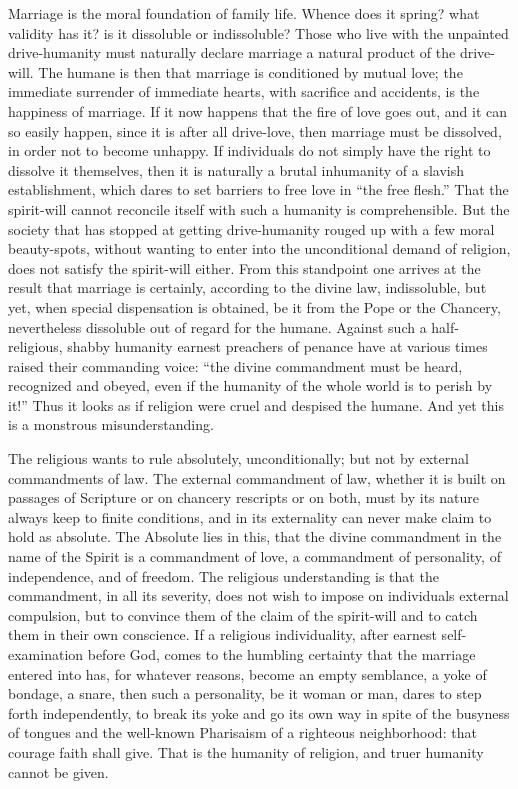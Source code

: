 \documentclass[12pt,a4paper,openany]{book}
\newcommand{\opage}[1]{\marginnote{\footnotesize\textit{[#1]}}}
\begin{document}
Marriage is the moral foundation of family life.
Whence does it spring? what validity has it? is it
dissoluble or indissoluble? Those who live with the unpainted
drive-humanity must naturally declare marriage
a natural product of the drive-will. The humane is
then that marriage is conditioned by mutual love;
the immediate surrender of immediate hearts, with sacrifice
and accidents, is the happiness of marriage. If it now happens
that the fire of love goes out, and it can so easily happen,
since it is after all drive-love, then marriage must be dissolved,
in order not to become unhappy. If individuals do not
simply have the right to dissolve it themselves, then it is naturally a brutal
inhumanity of a slavish establishment, which dares to
set barriers to free love in ``the free
flesh.'' That the spirit-will cannot reconcile itself with such a
humanity is comprehensible. But the society that has
stopped at getting drive-humanity rouged up with
a few moral beauty-spots, without wanting to enter
into the unconditional demand of religion, does not satisfy
the spirit-will either. From this standpoint one arrives at the result
that marriage is certainly, according to the divine law,
indissoluble, but yet, when special dispensation is obtained,
be it from the Pope or the Chancery, nevertheless dissoluble
out of regard for the humane. Against such a half-religious,
shabby humanity earnest preachers of penance
have at various times raised their commanding voice: ``the
divine commandment must be heard, recognized and obeyed, even if
the humanity of the whole world is to perish by it!'' Thus
it looks as if religion were cruel and despised
the humane. And yet this is a monstrous misunderstanding.

The religious wants to rule absolutely, unconditionally; but not
by external commandments of law. The external commandment of law, whether
it is built on passages of Scripture or on chancery rescripts or
\setcounter{footnote}{0}%
\opage{77}on both, must by its nature always keep to
finite conditions, and in its externality can
never make claim to hold as absolute. The
Absolute lies in this, that the divine commandment in the name of the Spirit
is a commandment of love, a commandment of personality, of independence,
and of freedom. The religious understanding
is that the commandment, in all its severity, does not wish to impose on individuals
external compulsion, but to convince them of the
claim of the spirit-will and to catch them in their own conscience. If
a religious individuality, after earnest self-examination before God,
comes to the humbling certainty that the marriage entered into has,
for whatever reasons, become an empty semblance, a yoke of bondage,
a snare, then such a personality, be
it woman or man, dares to step forth independently, to break its
yoke and go its own way in spite of the busyness of tongues and
the well-known Pharisaism of a righteous neighborhood: that courage
faith shall give. That is the humanity of religion, and
truer humanity cannot be given.
\end{document}
